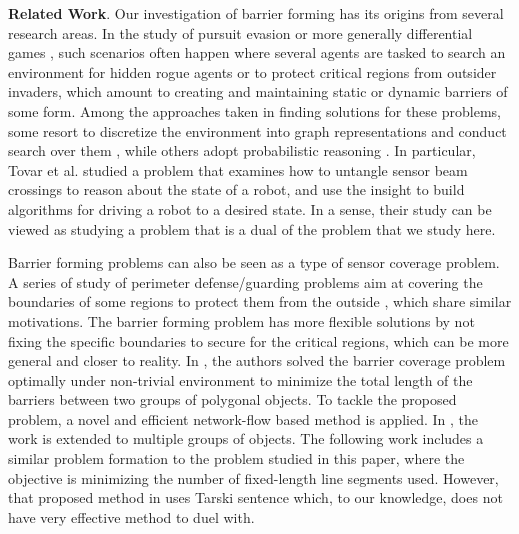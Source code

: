 \noindent\textbf{Related Work}.
Our investigation of barrier forming has its origins from several research areas.
In the study of pursuit evasion or more generally differential games \cite{ho1965differential,isaacs1999differential,hajek2008pursuit,tovar2009sensor,simov2000pursuit,guibas1997visibility,kameda2006online,kirousis1986searching, sachs2004visibility,lau2005optimal, yu2011shadow, olsen2022robust}, 
such scenarios often happen where several agents are tasked to search an environment for hidden rogue agents or to protect critical regions from outsider invaders, which amount to creating and maintaining static or dynamic barriers of some form.  
%
Among the approaches taken in finding solutions for these problems, some resort to discretize the environment into graph representations and conduct search over them \cite{kirousis1986searching, sachs2004visibility}, while others adopt probabilistic reasoning \cite{lau2005optimal, yu2011shadow}. 
%
In particular, Tovar et al. \cite{tovar2009sensor} studied a problem that examines how to untangle sensor beam crossings to reason about the state of a robot, and use the insight to build algorithms for driving a robot to a desired state. In a sense, their study can be viewed as studying a problem that is a dual of the problem that we study here. 


Barrier forming problems can also be seen as a type of sensor coverage problem. 
%
A series of study of perimeter defense/guarding problems aim at covering the boundaries of some regions to protect them from the outside \cite{shishika2020cooperative, macharet2020adaptive, fenghangaoyu2019efficient, fengyu2020optimally}, which share similar motivations. 
The barrier forming problem has more flexible solutions by not fixing the specific boundaries to secure for the critical regions,
which can be more general and closer to reality.
In \cite{kloder2007barrier}, the authors solved the barrier coverage problem optimally under non-trivial environment to minimize the total length of the barriers between two groups of polygonal objects. 
To tackle the proposed problem, a novel and efficient network-flow based method is applied. 
In \cite{abrahamsen2020geometric}, the work is extended to multiple groups of objects.
The following work \cite{kloder2008thesis} includes a similar problem formation to the problem studied in this paper, where the objective is minimizing the number of fixed-length line segments used. 
%
However, that proposed method in \cite{kloder2008thesis} uses Tarski sentence \cite{tarski1949decision} which, to our knowledge, does not have very effective method to duel with.

